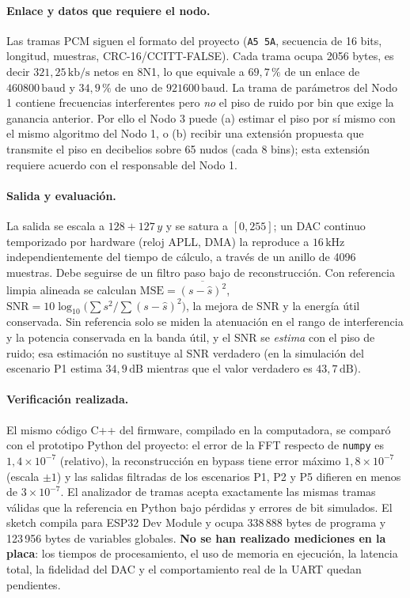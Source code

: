 \paragraph{Enlace y datos que requiere el nodo.}
Las tramas PCM siguen el formato del proyecto (\texttt{A5 5A}, secuencia de 16 bits, longitud, muestras, CRC-16/CCITT-FALSE).
Cada trama ocupa 2056 bytes, es decir $321{,}25\,\mathrm{kb/s}$ netos en 8N1, lo que equivale a $69{,}7\,\%$ de un enlace de
$460800\,\mathrm{baud}$ y $34{,}9\,\%$ de uno de $921600\,\mathrm{baud}$. La trama de par\'ametros del Nodo 1 contiene frecuencias
interferentes pero \emph{no} el piso de ruido por bin que exige la ganancia anterior. Por ello el Nodo 3 puede (a) estimar el piso
por s\'i mismo con el mismo algoritmo del Nodo 1, o (b) recibir una extensi\'on propuesta que transmite el piso en decibelios
sobre 65 nudos (cada 8 bins); esta extensi\'on requiere acuerdo con el responsable del Nodo 1.

\paragraph{Salida y evaluaci\'on.}
La salida se escala a $128+127\,y$ y se satura a $[0,255]$; un DAC continuo temporizado por hardware (reloj APLL, DMA) la
reproduce a $16\,\mathrm{kHz}$ independientemente del tiempo de c\'alculo, a trav\'es de un anillo de 4096 muestras. Debe seguirse de un
filtro paso bajo de reconstrucci\'on. Con referencia limpia alineada se calculan
$\mathrm{MSE}=\overline{(s-\hat{s})^2}$, $\mathrm{SNR}=10\log_{10}\!\big(\sum s^2/\sum(s-\hat{s})^2\big)$, la mejora de SNR y la
energ\'ia \'util conservada. Sin referencia solo se miden la atenuaci\'on en el rango de interferencia y la potencia conservada en la
banda \'util, y el SNR se \emph{estima} con el piso de ruido; esa estimaci\'on no sustituye al SNR verdadero (en la simulaci\'on del
escenario P1 estima $34{,}9\,\mathrm{dB}$ mientras que el valor verdadero es $43{,}7\,\mathrm{dB}$).

\paragraph{Verificaci\'on realizada.}
El mismo c\'odigo C++ del firmware, compilado en la computadora, se compar\'o con el prototipo Python del proyecto: el error de la
FFT respecto de \texttt{numpy} es $1{,}4\times10^{-7}$ (relativo), la reconstrucci\'on en bypass tiene error m\'aximo
$1{,}8\times10^{-7}$ (escala $\pm1$) y las salidas filtradas de los escenarios P1, P2 y P5 difieren en menos de $3\times10^{-7}$.
El analizador de tramas acepta exactamente las mismas tramas v\'alidas que la referencia en Python bajo p\'erdidas y errores de bit
simulados. El sketch compila para ESP32 Dev Module y ocupa 338\,888 bytes de programa y 123\,956 bytes de variables globales.
\textbf{No se han realizado mediciones en la placa}: los tiempos de procesamiento, el uso de memoria en ejecuci\'on, la latencia
total, la fidelidad del DAC y el comportamiento real de la UART quedan pendientes.

